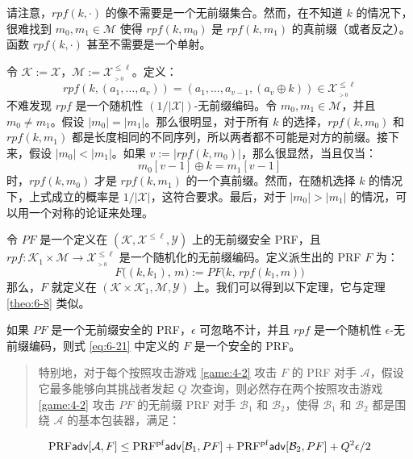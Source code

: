\noindent
请注意，$rpf(k,\cdot)$ 的像不需要是一个无前缀集合。然而，在不知道 $k$ 的情况下，很难找到 $m_0,m_1\in\mathcal{M}$ 使得 $rpf(k,m_0)$ 是 $rpf(k,m_1)$ 的真前缀（或者反之）。函数 $rpf(k,\cdot)$ 甚至不需要是一个单射。

\begin{snote}
令 $\mathcal{K}:=\mathcal{X}$，$\mathcal{M}:=\mathcal{X}^{\leq\ell}_{_{>0}}$。定义：
\[
rpf(k,(a_1,\dots,a_v))=(a_1,\dots,a_{v-1},(a_v\oplus k))\in\mathcal{X}^{\leq\ell}_{_{>0}}
\]
不难发现 $rpf$ 是一个随机性 $({1}/{|\mathcal{X}|})$-无前缀编码。令 $m_0,m_1\in\mathcal{M}$，并且 $m_0\neq m_1$。假设 $|m_0|=|m_1|$。那么很明显，对于所有 $k$ 的选择，$rpf(k,m_0)$ 和 $rpf(k,m_1)$ 都是长度相同的不同序列，所以两者都不可能是对方的前缀。接下来，假设 $|m_0|<|m_1|$。如果 $v:=|rpf(k,m_0)|$，那么很显然，当且仅当：
\[
m_0[v-1]\oplus k=m_1[v-1]
\]
时，$rpf(k,m_0)$ 才是 $rpf(k,m_1)$ 的一个真前缀。然而，在随机选择 $k$ 的情况下，上式成立的概率是 ${1}/{|\mathcal{X}|}$，这符合要求。最后，对于 $|m_0|>|m_1|$ 的情况，可以用一个对称的论证来处理。
\end{snote}

\begin{snote}[使用 $rpf$。]
令 $PF$ 是一个定义在 $(\mathcal{K},\mathcal{X}^{\leq\ell},\mathcal{Y})$ 上的无前缀安全 PRF，且 $rpf:\mathcal{K}_1\times\mathcal{M}\to\mathcal{X}^{\leq\ell}_{_{>0}}$ 是一个随机化的无前缀编码。定义派生出的 PRF $F$ 为：
\begin{equation}\label{eq:6-21}
F\big((k,k_1),\,m\big):=PF\big(k,\,rpf(k_1,m)\big)
\end{equation}
那么，$F$ 就定义在 $(\mathcal{K}\times\mathcal{K}_1,\mathcal{M},\mathcal{Y})$ 上。我们可以得到以下定理，它与定理 \ref{theo:6-8} 类似。
\end{snote}

\begin{theorem}\label{theo:6-9}
如果 $PF$ 是一个无前缀安全的 PRF，$\epsilon$ 可忽略不计，并且 $rpf$ 是一个随机性 $\epsilon$-无前缀编码，则式 \ref{eq:6-21} 中定义的 $F$ 是一个安全的 PRF。
\begin{quote}
特别地，对于每个按照攻击游戏 \ref{game:4-2} 攻击 $F$ 的 PRF 对手 $\mathcal{A}$，假设它最多能够向其挑战者发起 $Q$ 次查询，则必然存在两个按照攻击游戏 \ref{game:4-2} 攻击 $PF$ 的无前缀 PRF 对手 $\mathcal{B}_1$ 和 $\mathcal{B}_2$，使得 $\mathcal{B}_1$ 和 $\mathcal{B}_2$ 都是围绕 $\mathcal{A}$ 的基本包装器，满足：
\end{quote}
\begin{equation}\label{eq:6-22}
{\rm PRF}\mathsf{adv}[\mathcal{A},F]\leq
{\rm PRF^{pf}}\mathsf{adv}[\mathcal{B}_1,PF]+{\rm PRF^{pf}}\mathsf{adv}[\mathcal{B}_2,PF]+{Q^2\epsilon}/{2}
\end{equation}
\end{theorem}

